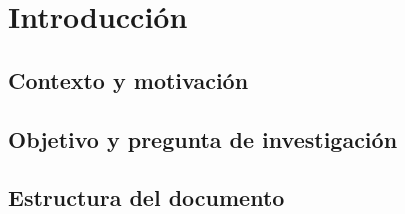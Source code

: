 \chapter{Introducción}
\section{Contexto y motivación}
\section{Objetivo y pregunta de investigación}
\section{Estructura del documento}
